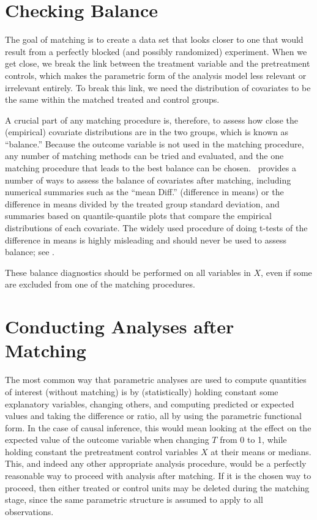 \section{Checking Balance}
\label{sec:balance-sum}

The goal of matching is to create a data set that looks closer to one
that would result from a perfectly blocked (and possibly randomized)
experiment.  When we get close, we break the link between the treatment
variable and the pretreatment controls, which makes the parametric
form of the analysis model less relevant or irrelevant entirely.  To
break this link, we need the distribution of covariates to be the same
within the matched treated and control groups.

A crucial part of any matching procedure is, therefore, to assess how
close the (empirical) covariate distributions are in the two groups,
which is known as ``balance.''  Because the outcome variable is not
used in the matching procedure, any number of matching methods can be
tried and evaluated, and the one matching procedure that leads to the
best balance can be chosen.  \MatchIt\ provides a number of ways to
assess the balance of covariates after matching, including numerical
summaries such as the ``mean Diff.'' (difference in means) or the
difference in means divided by the treated group standard deviation,
and summaries based on quantile-quantile plots that compare the
empirical distributions of each covariate.  The widely used procedure
of doing t-tests of the difference in means is highly misleading and
should never be used to assess balance; see \citet{ImaKinStu08}.

These balance diagnostics should be performed on all variables in $X$,
even if some are excluded from one of the matching procedures.

\section{Conducting Analyses after Matching}\label{s:qoi}

The most common way that parametric analyses are used to compute
quantities of interest (without matching) is by (statistically)
holding constant some explanatory variables, changing others, and
computing predicted or expected values and taking the difference or
ratio, all by using the parametric functional form.  In the case of
causal inference, this would mean looking at the effect on the
expected value of the outcome variable when changing $T$ from 0 to 1,
while holding constant the pretreatment control variables $X$ at their
means or medians.  This, and indeed any other appropriate analysis
procedure, would be a perfectly reasonable way to proceed with
analysis after matching.  If it is the chosen way to proceed, then
either treated or control units may be deleted during the matching
stage, since the same parametric structure is assumed to apply to all
observations.

